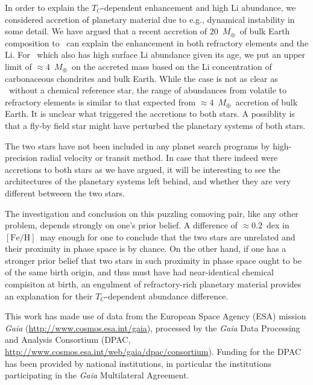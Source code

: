 \documentclass[manuscript]{aastex6}
\newcommand*\elem[1]{\ensuremath{\mathrm{#1}}}
\newcommand*\elemH[1]{\ensuremath{[\mathrm{#1}/\elem{H}]}}
\newcommand*{\feh}{\ensuremath{\elemH{Fe}}}
\newcommand{\sunanalog}{\text{Krios}}
\newcommand{\bizarreone}{\text{Kronos}}
\newcommand{\Tcondens}{\ensuremath{T_C}}
\newcommand{\mearth}{\ensuremath{M_\oplus}}
\begin{document}
In order to explain the $\Tcondens$-dependent enhancement and high \elem{Li}
abundance, we considered accretion of planetary material due to e.g., dynamical
instability in some detail.
We have argued that a recent accretion of $20$~\mearth\ of bulk Earth
composition to \bizarreone\ can explain the enhancement in both refractory
elements and the \elem{Li}.
For \sunanalog\ which also has high surface \elem{Li} abundance given its age,
we put an upper limit of $\approx 4$~\mearth\ on the accreted mass
based on the \elem{Li} concentration of carbonaceous chondrites and bulk Earth.
While the case is not as clear as \bizarreone\ without a chemical reference star,
the range of abundances from volatile to refractory elements is
similar to that expected from $\approx 4$~\mearth\ accretion of bulk Earth.
It is unclear what triggered the accretions to both stars.
A possiblity is that a fly-by field star might have
perturbed the planetary systems of both stars.

The two stars have not been included in any planet search programs
by high-precision radial velocity or transit method.
In case that there indeed were accretions to both stars as we
have argued, it will be interesting to see the architectures
of the planetary systems left behind, and whether
they are very different betweeen the two stars.

The investigation and conclusion on this puzzling comoving pair, like any other
problem, depends strongly on one's prior belief.
A difference of $\approx 0.2$~dex in \feh\ may enough for one to conclude that
the two stars are unrelated and their proximity in phase space is by chance.
On the other hand, if one has a stronger prior belief that two stars in such
proximity in phase space ought to be of the same birth origin, and thus
must have had near-identical chemical compisiton at birth, an engulment of
refractory-rich planetary material provides an explanation for their
$\Tcondens$-dependent abundance difference.



\acknowledgements

This work has made use of data from the European Space Agency (ESA) mission
{\it Gaia} (\url{http://www.cosmos.esa.int/gaia}), processed by the {\it Gaia}
Data Processing and Analysis Consortium (DPAC,
\url{http://www.cosmos.esa.int/web/gaia/dpac/consortium}). Funding for the DPAC
has been provided by national institutions, in particular the institutions
participating in the {\it Gaia} Multilateral Agreement.



\end{document}

